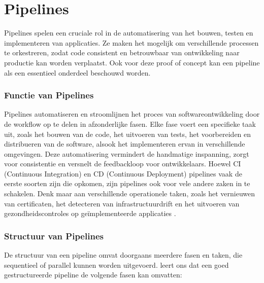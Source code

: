 \section{Pipelines}
\label{sec:pipelines}

Pipelines spelen een cruciale rol in de automatisering van het bouwen, testen en implementeren van applicaties. Ze maken het mogelijk om verschillende processen te orkestreren, zodat code consistent en betrouwbaar van ontwikkeling naar productie kan worden verplaatst. Ook voor deze proof of concept kan een pipeline als een essentieel onderdeel beschouwd worden.

\subsubsection{Functie van Pipelines}

Pipelines automatiseren en stroomlijnen het proces van softwareontwikkeling door de workflow op te delen in afzonderlijke fasen. Elke fase voert een specifieke taak uit, zoals het bouwen van de code, het uitvoeren van tests, het voorbereiden en distribueren van de software, alsook het implementeren ervan in verschillende omgevingen. Deze automatisering vermindert de handmatige inspanning, zorgt voor consistentie en versnelt de feedbackloop voor ontwikkelaars. Hoewel CI (Continuous Integration) en CD (Continuous Deployment) pipelines vaak de eerste soorten zijn die opkomen, zijn pipelines ook voor vele andere zaken in te schakelen. Denk maar aan verschillende operationele taken, zoals het vernieuwen van certificaten, het detecteren van infrastructuurdrift en het uitvoeren van gezondheidscontroles op geïmplementeerde applicaties \autocite{Merode2023}.

\subsubsection{Structuur van Pipelines}

De structuur van een pipeline omvat doorgaans meerdere fasen en taken, die sequentieel of parallel kunnen worden uitgevoerd. \textcite{Merode2023} leert ons dat een goed gestructureerde pipeline de volgende fasen kan omvatten:

